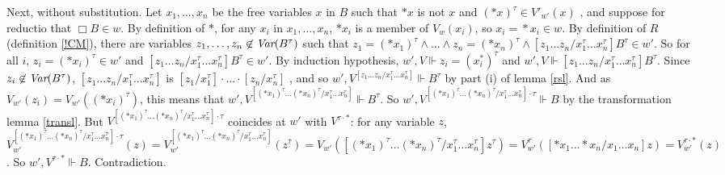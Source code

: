 \documentclass[11pt]{woarticle}
\newcommand{\cmnt}[1]{\iffalse #1 \fi}
\theoremstyle{break}
\theoremstyle{nonumberplain}
\newcommand{\SAT}{\Vdash}
\newcommand{\1}{\;\,|\;\,}
\newcommand{\var}{\emph{Var}}
\newcommand{\fvar}{\emph{Varf}}
\begin{document}
{  Next, without substitution. \cmnt{(Remember: $wRw'$ iff for every
    formula $B$ and variables $x_1\ldots x_n$, $y_1,\ldots,y_n$ such
    that the $x_1\ldots x_n$ are zero or more pairwise distinct
    members of $\fvar(B)$ and each $x_i$ is distinct from $y_i$ (xxx
    check!), if $x_1\!=\!y_1 \land \ldots \land x_n\!=\!y_n \land \Box
    B\in w$ and $y_1^\tau \!=\!y_1^\tau \land\ldots\land
    y_n^\tau\!=\!y_n^\tau \in w'$, then there are variables $z_1\ldots
    z_n \not\in \var(B^\tau)$ such that $z_1\!=\!y_1^\tau \land \ldots
    \land z_n\!=\!y_n^\tau \land [z_1\ldots z_n/x_1^\tau\ldots
    x_n^\tau] B^\tau \in w'$.)} %
  Let $x_1,\ldots,x_n$ be the free variables $x$ in $B$ such that $*x$
  is not $x$ and $(*x)^\tau \in V'_{w'}(x)$ \cmnt{xxx that's
    redundant?!}, and suppose for reductio that $\Box B \in w$. By
  definition of $*$, for any $x_i$ in $x_1,\ldots,x_n$, $*x_i$ is a
  member of $V_w(x_i)$, so $x_i\!=\!*x_i \in w$. By definition of $R$
  (definition \ref{!CM}), there are variables $z_1,\ldots,z_n \not\in
  \var(B^\tau)$ such that $z_1\!=\!(*x_1)^\tau \land \ldots \land
  z_n\!=\!(*x_n)^\tau \land [z_1\ldots z_n/x_1^\tau\ldots
  x_n^\tau]B^\tau \in w'$. So for all $i$, $z_i\!=\!(*x_i)^\tau \in
  w'$ and $[z_1\ldots z_n/x_1^\tau\ldots x_n^\tau]B^\tau \in w'$. By
  induction hypothesis, $w',V \SAT z_i\!=\!(x_i^*)^\tau$ and $w',V
  \SAT [z_1\ldots z_n/x_1^\tau\ldots x_n^\tau]B^\tau$. Since $z_i
  \not\in \var(B^\tau)$, $[z_1\ldots z_n/x_1^\tau\ldots x_n^\tau]$ is
  $[z_1/x_1^\tau]\cdot \ldots \cdot[z_n/x_n^\tau]$ \cmnt{XXXX?}, and
  so $w',V^{[z_1\ldots z_n/x_1^\tau\ldots x_n^\tau]} \SAT B^\tau$ by
  part (i) of lemma \ref{rsl}. And as $V_{w'}(z_i) =
  V_{w'}((*x_i)^\tau)$, this means that $w',V^{[(*x_1)^\tau\ldots
    (*x_n)^\tau/x_1^\tau\ldots x_n^\tau]} \SAT B^\tau$. So
  $w',V^{[(*x_1)^\tau\ldots (*x_n)^\tau/x_1^\tau\ldots x_n^\tau]\cdot
    \tau} \SAT B$ by the transformation lemma \ref{transl}. But
  $V^{[(*x_1)^\tau\ldots (*x_n)^\tau/x_1^\tau\ldots x_n^\tau]\cdot
    \tau}$ coincides at $w'$ with $V^{\tau \cdot *}$: for any variable
  $z$, $V^{[(*x_1)^\tau\ldots (*x_n)^\tau/x_1^\tau\ldots
    x_n^\tau]\cdot \tau}_{w'}(z) = V^{[(*x_1)^\tau\ldots
    (*x_n)^\tau/x_1^\tau\ldots x_n^\tau]}_{w'}(z^\tau) =
  V_{w'}([(*x_1)^\tau\ldots (*x_n)^\tau/x_1^\tau\ldots
  x_n^\tau]z^\tau) = V^\tau_{w'}([*x_1\ldots *x_n/x_1\ldots x_n]z) =
  V^{\tau\cdot *}_{w'}(z)$. So $w',V^{\tau\cdot *} \SAT
  B$. Contradiction.  

} %
\end{document}
